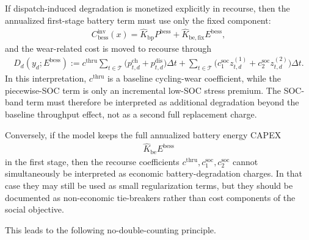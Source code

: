 If dispatch-induced degradation is monetized explicitly in recourse, then the annualized first-stage battery term must use only the fixed component:
\begin{align}
C^{\mathrm{inv}}_{\mathrm{bess}}(x)
= \widehat K_{\mathrm{bp}} P^{\mathrm{bess}} + \widehat K_{\mathrm{be,fix}} E^{\mathrm{bess}},
\label{eq:10a-battery-fixed-investment-only}
\end{align}
and the wear-related cost is moved to recourse through
\begin{align}
D_d(y_d;E^{\mathrm{bess}})
:= c^{\mathrm{thru}} \sum_{t\in\mathcal{T}} \big(p^{\mathrm{ch}}_{t,d}+p^{\mathrm{dis}}_{t,d}\big)\Delta t
+ \sum_{t\in\mathcal{T}} \Big(c^{\mathrm{soc}}_1 z^{(1)}_{t,d} + c^{\mathrm{soc}}_2 z^{(2)}_{t,d}\Big)\Delta t.
\label{eq:10a-battery-operational-degradation-cost}
\end{align}
In this interpretation, \(c^{\mathrm{thru}}\) is a baseline cycling-wear coefficient, while the piecewise-SOC term is only an incremental low-SOC stress premium. The SOC-band term must therefore be interpreted as additional degradation beyond the baseline throughput effect, not as a second full replacement charge.

Conversely, if the model keeps the full annualized battery energy CAPEX
\begin{align}
\widehat K_{\mathrm{be}} E^{\mathrm{bess}}
\label{eq:10a-full-battery-capex-annualized}
\end{align}
in the first stage, then the recourse coefficients \(c^{\mathrm{thru}},c^{\mathrm{soc}}_1,c^{\mathrm{soc}}_2\) cannot simultaneously be interpreted as economic battery-degradation charges. In that case they may still be used as small regularization terms, but they should be documented as non-economic tie-breakers rather than cost components of the social objective.

This leads to the following no-double-counting principle.

